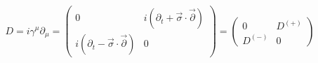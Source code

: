 \begin{equation}
D=i\gamma^{\mu}\partial_{\mu}=\left( 
\begin{array}{cc}
0&i(\partial_t+\vec{\sigma}\cdot\vec{\partial})\\
i(\partial_t-\vec{\sigma}\cdot\vec{\partial})&0
\end{array}\right)=\left(
\begin{array}{cc}
0&D^{(+)}\\
D^{(-)}&0
\end{array}\right)
\end{equation}

